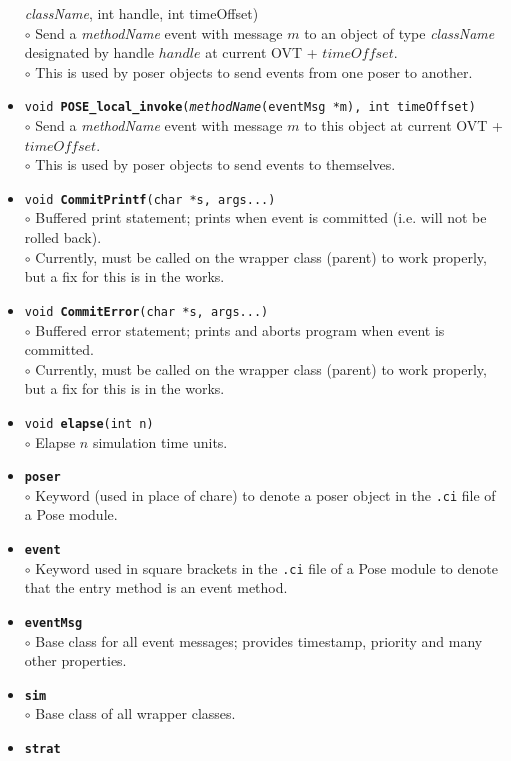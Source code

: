 \documentclass[10pt]{article}
\newcommand{\pose}{{\sc Pose}}
\begin{document}
\begin{itemize}
{{\it className}, int handle, int timeOffset)}\\
	$\circ$ Send a {\it methodName} event with message $m$ to an
	object of type {\it className} designated by handle $handle$
	at current OVT + $timeOffset$.\\
	$\circ$ This is used by poser objects to send events from one
	poser to another.
\item {\tt void {\bf POSE\_local\_invoke}({\it methodName}(eventMsg
	*m), int timeOffset)}\\
	$\circ$ Send a {\it methodName} event with message $m$ to this
	object at current OVT + $timeOffset$.\\
	$\circ$ This is used by poser objects to send events to themselves.
\item {\tt void {\bf CommitPrintf}(char *s, args...)}\\
	$\circ$ Buffered print statement; prints when event is
	committed (i.e. will not be rolled back).\\
	$\circ$ Currently, must be called on the wrapper class
	(parent) to work properly, but a fix for this is in the works.
\item {\tt void {\bf CommitError}(char *s, args...)}\\
	$\circ$ Buffered error statement; prints and aborts program
	when event is committed.\\
	$\circ$ Currently, must be called on the wrapper class
	(parent) to work properly, but a fix for this is in the works.
\item {\tt void {\bf elapse}(int n)}\\
	$\circ$ Elapse $n$ simulation time units.
\item {\tt {\bf poser}}\\
	$\circ$ Keyword (used in place of chare) to denote a poser
	object in the {\tt .ci} file of a \pose{} module.
\item {\tt {\bf event}}\\
	$\circ$ Keyword used in square brackets in the {\tt .ci} file
	of a \pose{} module to denote that the entry method is an event method.
\item {\tt {\bf eventMsg}}\\
	$\circ$ Base class for all event messages; provides timestamp,
	priority and many other properties.
\item {\tt {\bf sim}}\\
	$\circ$ Base class of all wrapper classes.
\item {\tt {\bf strat}}\\

\end{itemize}
\end{document}
